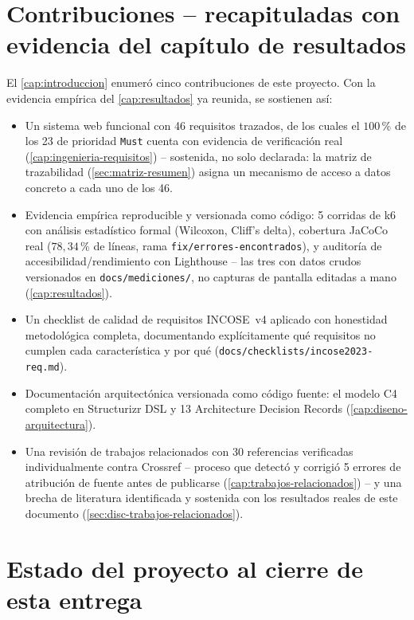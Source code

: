 \section{Contribuciones -- recapituladas con evidencia del capítulo de resultados}

El \autoref{cap:introduccion} enumeró cinco contribuciones de este
proyecto. Con la evidencia empírica del \autoref{cap:resultados} ya
reunida, se sostienen así:

\begin{itemize}[leftmargin=1.2cm]
  \item Un sistema web funcional con 46 requisitos trazados, de los
    cuales el $100$\,\% de los 23 de prioridad \texttt{Must} cuenta con
    evidencia de verificación real (\autoref{cap:ingenieria-requisitos}) --
    sostenida, no solo declarada: la matriz de trazabilidad
    (\autoref{sec:matriz-resumen}) asigna un mecanismo de acceso a datos
    concreto a cada uno de los 46.
  \item Evidencia empírica reproducible y versionada como código: 5
    corridas de k6 con análisis estadístico formal (Wilcoxon, Cliff's
    delta), cobertura JaCoCo real ($78{,}34$\,\% de líneas, rama
    \texttt{fix/errores-encontrados}), y auditoría de accesibilidad/rendimiento con
    Lighthouse -- las tres con datos crudos versionados en
    \texttt{docs/mediciones/}, no capturas de pantalla editadas a mano
    (\autoref{cap:resultados}).
  \item Un checklist de calidad de requisitos INCOSE~v4 aplicado con
    honestidad metodológica completa, documentando explícitamente qué
    requisitos no cumplen cada característica y por qué
    (\texttt{docs/checklists/incose2023-req.md}).
  \item Documentación arquitectónica versionada como código fuente: el
    modelo C4 completo en Structurizr DSL y 13 Architecture Decision
    Records (\autoref{cap:diseno-arquitectura}).
  \item Una revisión de trabajos relacionados con 30 referencias
    verificadas individualmente contra Crossref -- proceso que detectó y
    corrigió 5 errores de atribución de fuente antes de publicarse
    (\autoref{cap:trabajos-relacionados}) -- y una brecha de literatura
    identificada y sostenida con los resultados reales de este documento
    (\autoref{sec:disc-trabajos-relacionados}).
\end{itemize}

\section{Estado del proyecto al cierre de esta entrega}

